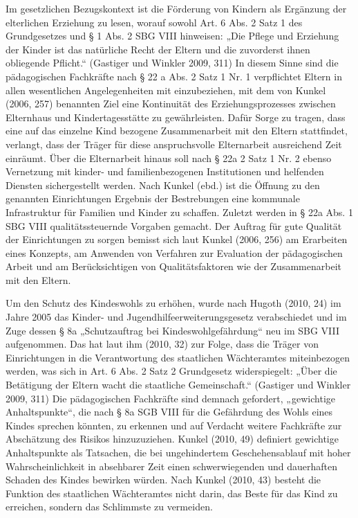 Im gesetzlichen Bezugskontext ist die Förderung von Kindern als Ergänzung der elterlichen Erziehung zu lesen, worauf sowohl Art. 6 Abs. 2 Satz 1 des Grundgesetzes und § 1 Abs. 2 SBG VIII hinweisen: „Die Pflege und Erziehung der Kinder ist das natürliche Recht der Eltern und die zuvorderst ihnen obliegende Pflicht.“ (Gastiger und Winkler 2009, 311) In diesem Sinne sind die pädagogischen Fachkräfte nach § 22 a Abs. 2 Satz 1 Nr. 1  verpflichtet Eltern in allen wesentlichen Angelegenheiten mit einzubeziehen, mit dem von Kunkel (2006, 257) benannten Ziel eine Kontinuität des Erziehungsprozesses zwischen Elternhaus und Kindertagesstätte zu gewährleisten. Dafür Sorge zu tragen, dass eine auf das einzelne Kind bezogene Zusammenarbeit mit den Eltern stattfindet, verlangt, dass der Träger für diese anspruchsvolle Elternarbeit ausreichend Zeit einräumt. Über die Elternarbeit hinaus soll nach § 22a 2 Satz 1 Nr. 2 ebenso Vernetzung mit kinder- und familienbezogenen Institutionen und helfenden Diensten sichergestellt werden. Nach Kunkel (ebd.) ist die Öffnung zu den genannten Einrichtungen Ergebnis der Bestrebungen eine kommunale Infrastruktur für Familien und Kinder zu schaffen. Zuletzt werden in § 22a Abs. 1 SBG VIII qualitätssteuernde Vorgaben gemacht. Der Auftrag für gute Qualität der Einrichtungen zu sorgen bemisst sich laut Kunkel (2006, 256) am Erarbeiten eines Konzepts, am Anwenden von Verfahren zur Evaluation der pädagogischen Arbeit und am Berücksichtigen von Qualitätsfaktoren wie der Zusammenarbeit mit den Eltern.

Um den Schutz des Kindeswohls zu erhöhen, wurde nach Hugoth (2010, 24) im Jahre 2005 das Kinder- und Jugendhilfeerweiterungsgesetz verabschiedet und im Zuge dessen § 8a „Schutzauftrag bei Kindeswohlgefährdung“ neu im SBG VIII aufgenommen. Das hat laut ihm (2010, 32) zur Folge, dass die Träger von Einrichtungen in die Verantwortung des staatlichen Wächteramtes miteinbezogen werden, was sich in Art. 6 Abs. 2 Satz 2 Grundgesetz widerspiegelt: „Über die Betätigung der Eltern wacht die staatliche Gemeinschaft.“ (Gastiger und Winkler 2009, 311) Die pädagogischen Fachkräfte sind demnach gefordert, „gewichtige Anhaltspunkte“, die nach § 8a SGB VIII für die Gefährdung des Wohls eines Kindes sprechen könnten, zu erkennen und auf Verdacht weitere Fachkräfte zur Abschätzung des Risikos hinzuzuziehen. Kunkel (2010, 49) definiert gewichtige Anhaltspunkte als Tatsachen, die bei ungehindertem Geschehensablauf mit hoher Wahrscheinlichkeit in absehbarer Zeit einen schwerwiegenden und dauerhaften Schaden des Kindes bewirken würden. Nach Kunkel (2010, 43) besteht die Funktion des staatlichen Wächteramtes nicht darin, das Beste für das Kind zu erreichen, sondern das Schlimmste zu vermeiden.

